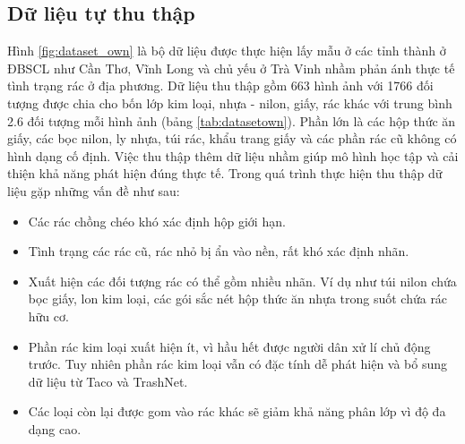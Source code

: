 \documentclass[../the.tex]{subfiles}
\begin{document}
\subsection{Dữ liệu tự thu thập}
{\fontsize{13}{12} \selectfont
Hình \ref{fig:dataset_own} là bộ dữ liệu được thực hiện lấy mẫu ở các tỉnh thành ở ĐBSCL như Cần Thơ, Vĩnh Long và chủ yếu ở Trà Vinh nhầm phản ánh thực tế tình trạng rác ở địa phương. 
Dữ liệu thu thập gồm 663 hình ảnh với 1766 đối tượng được chia cho bốn lớp kim loại, nhựa - nilon, giấy, rác khác với trung bình 2.6 đối tượng mỗi hình ảnh (bảng \ref{tab:datasetown}).
Phần lớn là các hộp thức ăn giấy, các bọc nilon, ly nhựa, túi rác, khẩu trang giấy và các phần rác cũ không có hình dạng cố định. 
Việc thu thập thêm dữ liệu nhầm giúp mô hình học tập và cải thiện khả năng phát hiện đúng thực tế. Trong quá trình thực hiện thu thập dữ liệu gặp những vấn đề như sau:
\begin{itemize}
	\item Các rác chồng chéo khó xác định hộp giới hạn.
	\item Tình trạng các rác cũ, rác nhỏ bị ẩn vào nền, rất khó xác định nhãn.
	\item Xuất hiện các đối tượng rác có thể gồm nhiều nhãn. Ví dụ như túi nilon chứa bọc giấy, lon kim loại, các gói sắc nét hộp thức ăn nhựa trong suốt chứa rác hữu cơ.
	\item Phần rác kim loại xuất hiện ít, vì hầu hết được người dân xử lí chủ động trước. Tuy nhiên phần rác kim loại vẫn có đặc tính dễ phát hiện và bổ sung dữ liệu từ Taco \cite{proença2020taco} và TrashNet.
	\item Các loại còn lại được gom vào rác khác sẽ giảm khả năng phân lớp vì độ đa dạng cao.
\end{itemize}

\bigskip
}
\end{document}
